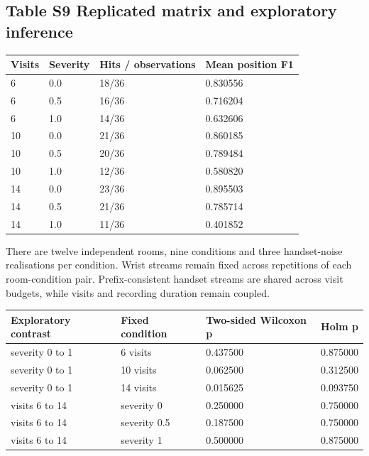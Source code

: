 \documentclass[10pt,letterpaper]{article}
\begin{document}
\begin{minipage}{\linewidth}\subsection*{Table S9 Replicated matrix and exploratory inference}


\begin{center}\small\begin{tabular}{@{}p{}p{}p{}p{}@{}}\toprule
\textbf{Visits} & \textbf{Severity} & \textbf{Hits / observations} & \textbf{Mean position F1} \\ \midrule
6 & 0.0 & 18/36 & 0.830556 \\
6 & 0.5 & 16/36 & 0.716204 \\
6 & 1.0 & 14/36 & 0.632606 \\
10 & 0.0 & 21/36 & 0.860185 \\
10 & 0.5 & 20/36 & 0.789484 \\
10 & 1.0 & 12/36 & 0.580820 \\
14 & 0.0 & 23/36 & 0.895503 \\
14 & 0.5 & 21/36 & 0.785714 \\
14 & 1.0 & 11/36 & 0.401852 \\
\bottomrule\end{tabular}\end{center}
\end{minipage}\par\medskip


There are twelve independent rooms, nine conditions and three
handset-noise realisations per condition. Wrist streams remain fixed
across repetitions of each room-condition pair. Prefix-consistent
handset streams are shared across visit budgets, while visits and
recording duration remain coupled.



\begin{center}\small\begin{tabular}{@{}p{}p{}p{}p{}@{}}\toprule
\textbf{Exploratory contrast} & \textbf{Fixed condition} & \textbf{Two-sided Wilcoxon p} & \textbf{Holm p} \\ \midrule
severity 0 to 1 & 6 visits & 0.437500 & 0.875000 \\
severity 0 to 1 & 10 visits & 0.062500 & 0.312500 \\
severity 0 to 1 & 14 visits & 0.015625 & 0.093750 \\
visits 6 to 14 & severity 0 & 0.250000 & 0.750000 \\
visits 6 to 14 & severity 0.5 & 0.187500 & 0.750000 \\
visits 6 to 14 & severity 1 & 0.500000 & 0.875000 \\
\bottomrule\end{tabular}\end{center}
\end{document}
